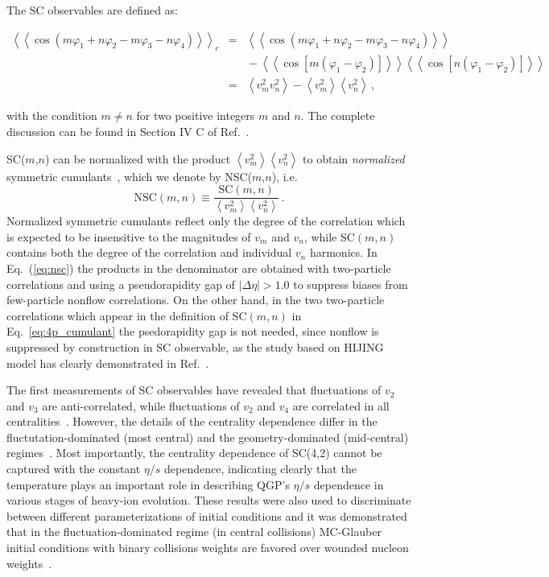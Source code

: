 The SC observables are defined as:
\begin{widetext}
\begin{eqnarray*}
\left<\left<\cos(m\varphi_1\!+\!n\varphi_2\!-\!m\varphi_3-\!n\varphi_4)\right>\right>_c &=& \left<\left<\cos(m\varphi_1\!+\!n\varphi_2\!-\!m\varphi_3-\!n\varphi_4)\right>\right>\nonumber\\
&&{}-\left<\left<\cos[m(\varphi_1\!-\!\varphi_2)]\right>\right>\left<\left<\cos[n(\varphi_1\!-\!\varphi_2)]\right>\right>\nonumber\\
&=&\left<v_{m}^2v_{n}^2\right>-\left<v_{m}^2\right>\left<v_{n}^2\right>\,,%
\label{eq:4p_cumulant}
\end{eqnarray*}
\end{widetext}
%
with the condition $m\neq n$ for two positive integers $m$ and $n$. The complete discussion can be found in Section IV C of Ref.~\cite{Bilandzic:2013kga}.

SC($m$,$n$) can be normalized with the product $\left<v_{m}^2\right>\left<v_{n}^2\right>$ to obtain \textit{normalized} symmetric cumulants~\cite{ALICE:2016kpq,Giacalone:2016afq}, which we denote by NSC($m$,$n$), i.e.
%
\begin{equation}
\mathrm{NSC}(m,n) \equiv \frac{\mathrm{SC}(m,n)}{\left<v_{m}^2\right>\left<v_{n}^2\right>}\,.
\label{eq:nsc}
\end{equation}
%
Normalized symmetric cumulants reflect only the degree of the correlation which is expected to be insensitive to the magnitudes of $v_{m}$ and $v_{n}$, while SC$(m,n)$ contains both the degree of the correlation and individual $v_{n}$ harmonics. In Eq.~(\ref{eq:nsc}) the products in the denominator are obtained with two-particle correlations and using a pseudorapidity gap of $|\Delta\eta|>1.0$ to suppress biases from few-particle nonflow correlations. On the other hand, in the two two-particle correlations which appear in the definition of SC$(m,n)$ in Eq.~\ref{eq:4p_cumulant} the psedorapidity gap is not needed, since nonflow is suppressed by construction in SC observable, as the study based on HIJING model has clearly demonstrated in Ref.~\cite{ALICE:2016kpq}.

The first measurements of SC observables have revealed that fluctuations of $v_2$ and $v_3$ are anti-correlated, while fluctuations of $v_2$ and $v_4$ are correlated in all centralities~\cite{ALICE:2016kpq}. However, the details of the centrality dependence differ in the fluctutation-dominated (most central) and the geometry-dominated (mid-central) regimes~\cite{ALICE:2016kpq}. Most importantly, the centrality dependence of SC(4,2) cannot be captured with the constant $\eta/s$ dependence, indicating clearly that the temperature plays an important role in describing QGP's $\eta/s$ dependence in various stages of heavy-ion evolution. These results were also used to discriminate between different parameterizations of initial conditions and it was demonstrated that in the fluctuation-dominated regime (in central collisions) MC-Glauber initial conditions with binary collisions weights are favored over wounded nucleon weights~\cite{ALICE:2016kpq}. 

